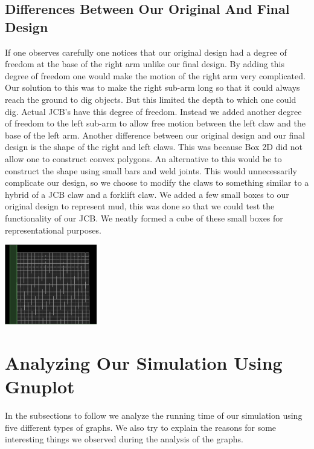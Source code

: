 \documentclass[11pt]{article}
\begin{document}
	\subsection{Differences Between Our Original And Final Design}
	If one observes carefully one notices that our original design had a degree of freedom at the base of the right arm unlike our final design. By adding this degree of freedom one would make the motion of the right arm very complicated. Our solution to this was to make the right sub-arm long so that it could always reach the ground to dig objects. But this limited the depth to which one could dig. Actual JCB's have this degree of freedom\cite{youtube}.
Instead we added another degree of freedom to the left sub-arm to allow free motion between the left claw and the base of the left arm.\newline
	Another difference between our original design and our final design is the shape of the right and left claws. This was because Box 2D did not allow one to construct convex polygons. An alternative to this would be to construct the shape using small bars and weld joints. This would unnecessarily complicate our design, so we choose to modify the claws to something similar to a hybrid of a JCB claw and a forklift claw\cite{wiki}.\newline
	 We added a few small boxes to our original design to represent mud, this was done so that we could test the functionality of our JCB. We neatly formed a cube of these small boxes for representational purposes.
	\begin{center}\includegraphics[height=3.5cm]{Boxes.png}\end{center}
\section{Analyzing Our Simulation Using Gnuplot}
	In the subsections to follow we analyze the running time of our simulation using five different types of graphs. We also try to explain the reasons for some interesting things we observed during the analysis of the graphs. 
\end{document}
